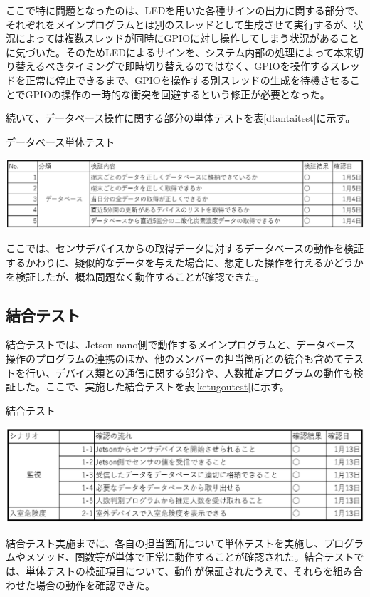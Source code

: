 ここで特に問題となったのは、LEDを用いた各種サインの出力に関する部分で、それぞれをメインプログラムとは別のスレッドとして生成させて実行するが、状況によっては複数スレッドが同時にGPIOに対し操作してしまう状況があることに気づいた。そのためLEDによるサインを、システム内部の処理によって本来切り替えるべきタイミングで即時切り替えるのではなく、GPIOを操作するスレッドを正常に停止できるまで、GPIOを操作する別スレッドの生成を待機させることでGPIOの操作の一時的な衝突を回避するという修正が必要となった。

続いて、データベース操作に関する部分の単体テストを表\ref{dtantaitest}に示す。

\begin{table}[H]
	\centering
	\caption{データベース単体テスト}
	\includegraphics[width=15cm]{dtantaitest.eps}
	\label{dtantaitest}
\end{table}

ここでは、センサデバイスからの取得データに対するデータベースの動作を検証するかわりに、疑似的なデータを与えた場合に、想定した操作を行えるかどうかを検証したが、概ね問題なく動作することが確認できた。

\subsection{結合テスト}
結合テストでは、Jetson nano側で動作するメインプログラムと、データベース操作のプログラムの連携のほか、他のメンバーの担当箇所との統合も含めてテストを行い、デバイス類との通信に関する部分や、人数推定プログラムの動作も検証した。ここで、実施した結合テストを表\ref{ketugoutest}に示す。

\begin{table}[H]
	\centering
	\caption{結合テスト}
	\includegraphics[width=15cm]{ketugoutest.eps}
	\label{ketugoutest}
\end{table}

結合テスト実施までに、各自の担当箇所について単体テストを実施し、プログラムやメソッド、関数等が単体で正常に動作することが確認された。結合テストでは、単体テストの検証項目について、動作が保証されたうえで、それらを組み合わせた場合の動作を確認できた。


